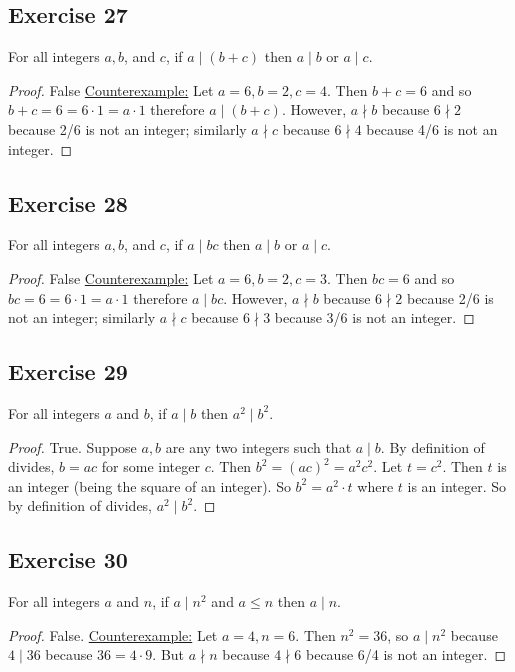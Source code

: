 \documentclass[14pt]{extarticle}
\begin{document}
\subsection{Exercise 27}
For all integers $a, b$, and $c$, if $a\mid (b + c)$ then $a \mid b$ or $a\mid c$.

\begin{proof}
    False \underline{Counterexample:} Let $a=6,b=2,c=4$. Then $b+c = 6$ and so $b+c = 6 = 6 \cdot 1 = a \cdot 1$ therefore $a \mid (b+c)$. However, $a \nmid b$ because $6 \nmid 2$ because 2/6 is not an integer; similarly $a \nmid c$ because $6 \nmid 4$ because 4/6 is not an integer.
\end{proof}

\subsection{Exercise 28}
For all integers $a, b$, and $c$, if $a\mid bc$ then $a\mid b$ or $a\mid c$.

\begin{proof}
    False \underline{Counterexample:} Let $a=6,b=2,c=3$. Then $bc = 6$ and so $bc = 6 = 6 \cdot 1 = a \cdot 1$ therefore $a \mid bc$. However, $a \nmid b$ because $6 \nmid 2$ because 2/6 is not an integer; similarly $a \nmid c$ because $6 \nmid 3$ because 3/6 is not an integer.
\end{proof}

\subsection{Exercise 29}
For all integers $a$ and $b$, if $a\mid b$ then $a^2 \mid b^2$.

\begin{proof}
    True. Suppose $a,b$ are any two integers such that $a \mid b$. By definition of divides, $b = ac$ for some integer $c$. Then $b^2 = (ac)^2 = a^2c^2$. Let $t = c^2$. Then $t$ is an integer (being the square of an integer). So $b^2 = a^2 \cdot t$ where $t$ is an integer. So by definition of divides, $a^2 \mid b^2$.
\end{proof}

\subsection{Exercise 30}
For all integers $a$ and $n$, if $a\mid n^2$ and $a \leq n$ then $a \mid n$.

\begin{proof}
    False. \underline{Counterexample:} Let $a = 4, n = 6$. Then $n^2 = 36$, so $a \mid n^2$ because $4 \mid 36$ because $36 = 4 \cdot 9$. But $a \nmid n$ because $4 \nmid 6$ because 6/4 is not an integer.
\end{proof}
\end{document}

